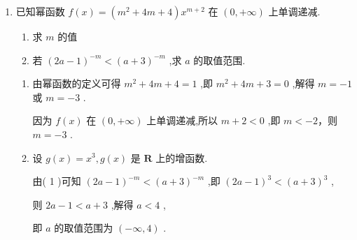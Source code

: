\begin{enumerate}
\begin{jieda}
\begin{enumerate}
            又因为 $m \in  \mathbf{Z}$ ,所以 $m = 1$ 或 $m = 2$ 或 $m = 3$ ,
            
            当 $m = 1$ 或 $m = 3$ 时, $f\left( x\right)  = {x}^{3}$ 为奇函数,图象关于原点对称 (舍);
            
            当 $m = 2$ 时, $f\left( x\right)  = {x}^{4}$ 为偶函数,图象关于 $y$ 轴对称,符合题意;
            
            综上所述, $m = 2$ .
            \item 由(1)得 $f\left( x\right)  = {x}^{4}$ 为偶函数,且在区间 $\left( {0, + \infty }\right)$ 上是严格增函数,
            
            则由 $f\left( {{2a} - 1}\right)  < f\left( {a + 1}\right)$ 得 $\left| {{2a} - 1}\right|  < \left| {a + 1}\right|$ ,
            
            即 ${\left( 2a - 1\right) }^{2} < {\left( a + 1\right) }^{2}$ ,即 ${a}^{2} - {2a} < 0$ ,解得 $0 < a < 2$ ,
            
            所以满足 $f\left( {{2a} - 1}\right)  < f\left( {a + 1}\right)$ 的实数 $a$ 的取值范围为 $0 < a < 2$ .
        \end{enumerate}
    \end{jieda}
    \item 已知幂函数 $f\left( x\right)  = \left( {{m}^{2} + {4m} + 4}\right) {x}^{m + 2}$ 在 $\left( {0, + \infty }\right)$ 上单调递减.
    \begin{enumerate}
        \item 求 $m$ 的值
        \item 若 ${\left( 2a - 1\right) }^{-m} < {\left( a + 3\right) }^{-m}$ ,求 $a$ 的取值范围.
    \end{enumerate}
    \begin{jieda}
        \begin{enumerate}
            \item 由幂函数的定义可得 ${m}^{2} + {4m} + 4 = 1$ ,即 ${m}^{2} + {4m} + 3 = 0$ ,解得 $m =  - 1$ 或 $m =  - 3$ .
            
            因为 $f\left( x\right)$ 在 $\left( {0, + \infty }\right)$ 上单调递减,所以 $m + 2 < 0$ ,即 $m <  - 2$，则 $m =  - 3$ .

            \item 设 $g\left( x\right)  = {x}^{3},g\left( x\right)$ 是 $\mathbf{R}$ 上的增函数.
            
            由( 1 )可知 ${\left( 2a - 1\right) }^{-m} < {\left( a + 3\right) }^{-m}$ ,即 ${\left( 2a - 1\right) }^{3} < {\left( a + 3\right) }^{3}$ ,
            
            则 ${2a} - 1 < a + 3$ ,解得 $a < 4$ ,
            
            即 $a$ 的取值范围为 $\left( {-\infty ,4}\right)$ .
        \end{enumerate}
    \end{jieda}
\end{enumerate}
